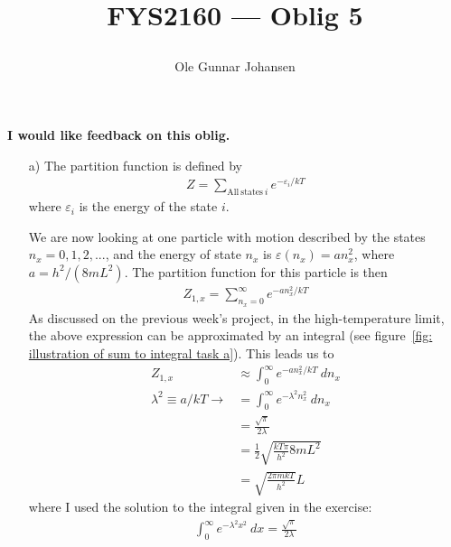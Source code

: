 \documentclass[11pt]{article}
\newcounter{excount}
\newenvironment{exercise}[1][]{\addtocounter{excount}{1} \noindent {\bf Exercise
    \arabic{excount} #1}\hspace{2mm}}{\vspace{4mm}}
\newcommand{\ObligNumber}{5 }
\begin{document}
\title{\begin{huge}FYS2160 ---  Oblig \ObligNumber\end{huge}}
\author{Ole Gunnar Johansen}

\maketitle
\noindent

\begin{center}
 \textbf{I would like feedback on this oblig.\\}
\end{center}
\begin{exercise}
	\begin{itemize}
		\item[a)]
			The partition function is defined by
			\begin{align*}
				Z = \sum_{\mathrm{All \ states} \ i} e^{-\varepsilon_i/kT}
			\end{align*}
			where $\varepsilon_i$ is the energy of the state $i$.
			
			We are now looking at one particle with motion described by the states $n_x = 0,1,2,...$, and the energy of state $n_x$ is $\varepsilon(n_x) = an_x^2$, where $a=h^2/(8mL^2)$. The partition function for this particle is then
			\begin{align*}
				Z_{1,x} = \sum_{n_x=0}^\infty e^{-an_x^2/kT}
			\end{align*}
			As discussed on the previous week's project, in the high-temperature limit, the above expression can be approximated by an integral (see figure~\ref{fig: illustration of sum to integral task a}). This leads us to
			\begin{align}
				Z_{1,x} 									&\approx \int_{0}^{\infty} e^{-an_x^2/kT} \ dn_x  \nonumber \\
				\lambda^2 \equiv a/kT \rightarrow	&= \int_{0}^{\infty} e^{-\lambda^2n_x^2} \ dn_x \nonumber \\
																&= \frac{\sqrt{\pi}}{2\lambda} \nonumber \\
																&= \frac{1}{2}\sqrt{\frac{kT\pi}{h^2}8mL^2} \nonumber \\
																&= \sqrt{\frac{2\pi mkT}{h^2}}L \label{eq: part.func one part. 1D evaluated}
			\end{align}
			where I used the solution to the integral given in the exercise:
			\begin{align*}
				\int_{0}^{\infty} e^{-\lambda^2x^2} \ dx = \frac{\sqrt{\pi}}{2\lambda}
			\end{align*}
			

\end{itemize}
\end{exercise}
\end{document}
